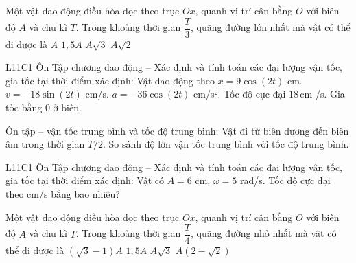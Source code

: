 \begin{ex}
Một vật dao động điều hòa dọc theo trục $Ox$, quanh vị trí cân bằng $O$ với biên độ $A$ và chu kì $T$. Trong khoảng thời gian $\dfrac{T}{3}$, quãng đường lớn nhất mà vật có thể đi được là
\choice
{$A$}
{$1{,}5A$}
{\True $A\sqrt{3}$}
{$A\sqrt{2}$}
\end{ex}

\begin{ex}
L11C1 Ôn Tập chương dao động – Xác định và tính toán các đại lượng vận tốc, gia tốc tại thời điểm xác định: Vật dao động theo $x=9\cos(2t)$ cm.
\choiceTF
{\True $v=-18\sin(2t)$ cm/s.}
{\True $a=-36\cos(2t)$ cm/s².}
{\True Tốc độ cực đại $18\,\text{cm}$ /s.}
{Gia tốc bằng 0 ở biên.}
\end{ex}

\begin{ex}
Ôn tập – vận tốc trung bình và tốc độ trung bình: Vật đi từ biên dương đến biên âm trong thời gian $T/2$. So sánh độ lớn vận tốc trung bình với tốc độ trung bình.
\choiceTF

\end{ex}

\begin{ex}
L11C1 Ôn Tập chương dao động – Xác định và tính toán các đại lượng vận tốc, gia tốc tại thời điểm xác định: Vật có $A=6$ cm, $\omega=5$ rad/s. Tốc độ cực đại theo cm/s bằng bao nhiêu?
\end{ex}

\begin{ex}
Một vật dao động điều hòa dọc theo trục $Ox$, quanh vị trí cân bằng $O$ với biên độ $A$ và chu kì $T$. Trong khoảng thời gian $\dfrac{T}{4}$, quãng đường nhỏ nhất mà vật có thể đi được là
\choice
{$(\sqrt{3}-1)A$}
{$1{,}5A$}
{$A\sqrt{3}$}
{\True $A(2-\sqrt{2})$}
\end{ex}

